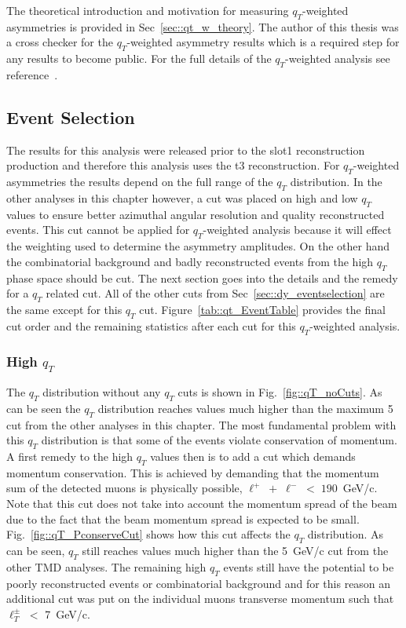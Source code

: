 The theoretical introduction and motivation for measuring $q_T$-weighted
asymmetries is provided in Sec~\ref{sec::qt_w_theory}.  The author of this
thesis was a cross checker for the $q_T$-weighted asymmetry results which is a
required step for any results to become public.  For the full details of the
$q_T$-weighted analysis see reference~\cite{janthesis}.

\subsection{Event Selection}
The results for this analysis were released prior to the slot1 reconstruction
production and therefore this analysis uses the t3 reconstruction.  For
$q_T$-weighted asymmetries the results depend on the full range of the $q_T$
distribution.  In the other analyses in this chapter however, a cut was placed
on high and low $q_T$ values to ensure better azimuthal angular resolution and
quality reconstructed events.  This cut cannot be applied for $q_T$-weighted
analysis because it will effect the weighting used to determine the asymmetry
amplitudes.  On the other hand the combinatorial background and badly
reconstructed events from the high $q_T$ phase space should be cut.  The next
section goes into the details and the remedy for a $q_T$ related cut. All of the
other cuts from Sec~\ref{sec::dy_eventselection} are the same except for this
$q_T$ cut. Figure~\ref{tab::qt_EventTable} provides the final cut order and the
remaining statistics after each cut for this $q_T$-weighted analysis.

\subsubsection{High $q_T$} \label{sec::high_qt}
The $q_T$ distribution without any $q_T$ cuts is shown in
Fig.~\ref{fig::qT_noCuts}.  As can be seen the $q_T$ distribution reaches values
much higher than the maximum 5~{\gvc} cut from the other analyses in this
chapter.  The most fundamental problem with this $q_T$ distribution is that some
of the events violate conservation of momentum.  A first remedy to the high
$q_T$ values then is to add a cut which demands momentum conservation.  This is
achieved by demanding that the momentum sum of the detected muons is physically
possible, $\ell^+ \; + \; \ell^- \; < \; 190$~GeV/c.  Note that this cut does
not take into account the momentum spread of the beam due to the fact that the
beam momentum spread is expected to be small.  Fig.~\ref{fig::qT_PconserveCut}
shows how this cut affects the $q_T$ distribution.  As can be seen, $q_T$ still
reaches values much higher than the 5~GeV/c cut from the other TMD analyses.
The remaining high $q_T$ events still have the potential to be poorly
reconstructed events or combinatorial background and for this reason an
additional cut was put on the individual muons transverse momentum such that
$\ell_T^{\pm} \; <$ 7~GeV/c.


